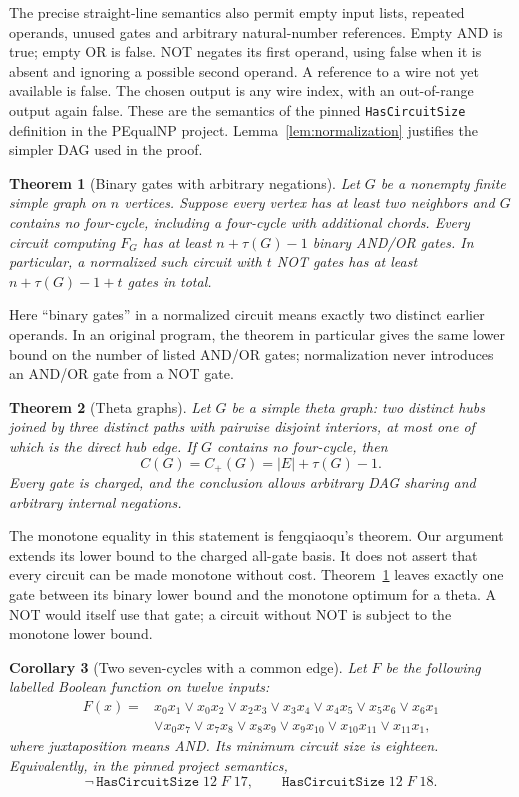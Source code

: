 \documentclass[11pt]{article}
\newcommand{\OR}{\mathbin{\vee}}
\newtheorem{theorem}{Theorem}[section]
\newtheorem{corollary}[theorem]{Corollary}
\theoremstyle{definition}
\theoremstyle{remark}
\begin{document}
The precise straight-line semantics also permit empty input lists, repeated
operands, unused gates and arbitrary natural-number references. Empty AND
is true; empty OR is false. NOT negates its first operand, using false when
it is absent and ignoring a possible second operand. A reference to a wire
not yet available is false. The chosen output is any wire index, with an
out-of-range output again false. These are the semantics of the pinned
\texttt{HasCircuitSize} definition in the PEqualNP project\cite{project}.
Lemma~\ref{lem:normalization} justifies the simpler DAG used in the proof.

\begin{theorem}[Binary gates with arbitrary negations]\label{thm:binary}
Let $G$ be a nonempty finite simple graph on $n$ vertices. Suppose every
vertex has at least two neighbors and $G$ contains no four-cycle, including
a four-cycle with additional chords. Every circuit computing $F_G$ has at
least $n+\tau(G)-1$ binary AND/OR gates. In particular, a normalized such
circuit with $t$ NOT gates has at least $n+\tau(G)-1+t$ gates in total.
\end{theorem}

Here ``binary gates'' in a normalized circuit means exactly two distinct
earlier operands. In an original program, the theorem in particular gives
the same lower bound on the number of listed AND/OR gates; normalization
never introduces an AND/OR gate from a NOT gate.

\begin{theorem}[Theta graphs]\label{thm:theta}
Let $G$ be a simple theta graph: two distinct hubs joined by three distinct paths
with pairwise disjoint interiors, at most one of which is the direct hub edge. If $G$ contains no four-cycle, then
\[
                 C(G)=C_+(G)=|E|+\tau(G)-1.
\]
Every gate is charged, and the conclusion allows arbitrary DAG sharing and
arbitrary internal negations.
\end{theorem}

The monotone equality in this statement is fengqiaoqu's theorem\cite{mono}.
Our argument extends its lower bound to the charged all-gate basis.
It does not assert that every circuit can be made monotone without cost.
Theorem~\ref{thm:binary} leaves exactly one gate between its binary lower
bound and the monotone optimum for a theta. A NOT would itself use that
gate; a circuit without NOT is subject to the monotone lower bound.

\begin{corollary}[Two seven-cycles with a common edge]\label{cor:18}
Let $F$ be the following labelled Boolean function on twelve inputs:
\begin{align*}
F(x)={}&x_0x_1\OR x_0x_2\OR x_2x_3\OR x_3x_4\OR x_4x_5
       \OR x_5x_6\OR x_6x_1\\
     &\OR x_0x_7\OR x_7x_8\OR x_8x_9\OR x_9x_{10}
       \OR x_{10}x_{11}\OR x_{11}x_1,
\end{align*}
where juxtaposition means AND. Its minimum circuit size is eighteen.
Equivalently, in the pinned project semantics,
\[
 \neg\,\texttt{HasCircuitSize}\;12\;F\;17,
 \qquad \texttt{HasCircuitSize}\;12\;F\;18.
\]
\end{corollary}
\end{document}
